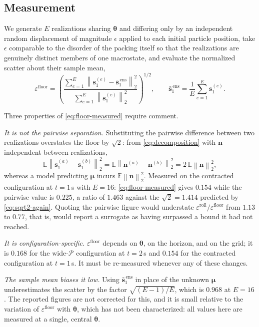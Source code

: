 \documentclass[11pt]{article}
\newcommand{\E}{\mathbb{E}}
\newcommand{\bs}[1]{\boldsymbol{#1}}
\newcommand{\norm}[1]{\left\lVert #1 \right\rVert}
\begin{document}
\subsection{Measurement}

We generate $E$ realizations sharing $\bs{\theta}$ and differing only by an independent random
displacement of magnitude $\epsilon$ applied to each initial particle position, take $\epsilon$
comparable to the disorder of the packing itself so that the realizations are genuinely distinct
members of one macrostate, and evaluate the normalized scatter about their sample mean,
\begin{equation}
  \varepsilon^{\text{floor}}
  = \left( \frac{\sum_{e=1}^{E} \norm{ \bs{s}_1^{(e)} - \bar{\bs{s}}_1^{\,\text{ens}} }_2^2}
  {\sum_{e=1}^{E} \norm{ \bs{s}_1^{(e)} }_2^2} \right)^{1/2},
  \qquad
  \bar{\bs{s}}_1^{\,\text{ens}} = \frac{1}{E} \sum_{e=1}^{E} \bs{s}_1^{(e)} .
  \label{eq:floor-measured}
\end{equation}

Three properties of \eqref{eq:floor-measured} require comment.

\emph{It is not the pairwise separation.} Substituting the pairwise difference between two
realizations overstates the floor by $\sqrt{2}$: from \eqref{eq:decomposition} with $\bs{n}$
independent between realizations,
\begin{equation}
  \E \norm{ \bs{s}_1^{(a)} - \bs{s}_1^{(b)} }_2^2
  = \E \norm{ \bs{n}^{(a)} - \bs{n}^{(b)} }_2^2
  = 2\, \E \norm{ \bs{n} }_2^2 ,
  \label{eq:sqrt2-again}
\end{equation}
whereas a model predicting $\bs{\mu}$ incurs $\E\norm{\bs{n}}_2^2$. Measured on the contracted
configuration at $t = 1$\,s with $E = 16$: \eqref{eq:floor-measured} gives $0.154$ while the pairwise
value is $0.225$, a ratio of $1.463$ against the $\sqrt{2} = 1.414$ predicted by
\eqref{eq:sqrt2-again}. Quoting the pairwise figure would understate
$\varepsilon^{\text{roll}}/\varepsilon^{\text{floor}}$ from $1.13$ to $0.77$, that is, would report a
surrogate as having surpassed a bound it had not reached.

\emph{It is configuration-specific.} $\varepsilon^{\text{floor}}$ depends on $\bs{\theta}$, on the
horizon, and on the grid; it is $0.168$ for the wide-$\mathcal{P}$ configuration at $t = 2$\,s and
$0.154$ for the contracted configuration at $t = 1$\,s. It must be re-measured whenever any of these
changes.

\emph{The sample mean biases it low.} Using $\bar{\bs{s}}_1^{\,\text{ens}}$ in place of the unknown
$\bs{\mu}$ underestimates the scatter by the factor $\sqrt{(E-1)/E}$, which is $0.968$ at $E = 16$.
The reported figures are not corrected for this, and it is small relative to the variation of
$\varepsilon^{\text{floor}}$ with $\bs{\theta}$, which has not been characterized: all values here
are measured at a single, central $\bs{\theta}$.
\end{document}
